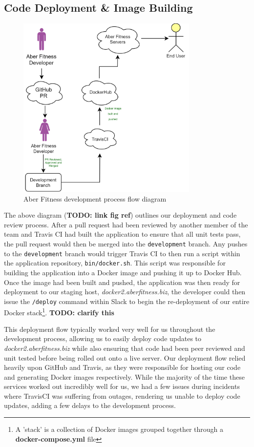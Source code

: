 
\subsection{Code Deployment \& Image Building}
\begin{figure}[H]
    \centering
    \includegraphics[width=0.8\textwidth]{Images/diagram_af.png}
    \caption{Aber Fitness development process flow diagram}
\end{figure}

The above diagram (\textbf{TODO: link fig ref}) outlines our deployment and code review process. After a pull request had been reviewed by another member of the team and Travis CI had built the application to ensure that all unit tests pass, the pull request would then be merged into the \lstinline{development} branch. Any pushes to the \lstinline{development} branch would trigger Travis CI to then run a script within the application repository, \lstinline{bin/docker.sh}. This script was responsible for building the application into a Docker image and pushing it up to Docker Hub. Once the image had been built and pushed, the application was then ready for deployment to our staging host, \textit{docker2.aberfitness.biz}, the developer could then issue the \lstinline{/deploy} command within Slack to begin the re-deployment of our entire Docker stack\footnote{A 'stack' is a collection of Docker images grouped together through a \textbf{docker-compose.yml} file}. \textbf{TODO: clarify this}

This deployment flow typically worked very well for us throughout the development process, allowing us to easily deploy code updates to \textit{docker2.aberfitness.biz} while also ensuring that code had been peer reviewed and unit tested before being rolled out onto a live server. Our deployment flow relied heavily upon GitHub and Travis, as they were responsible for hosting our code and generating Docker images respectively. While the majority of the time these services worked out incredibly well for us, we had a few issues during incidents where TravisCI was suffering from outages, rendering us unable to deploy code updates, adding a few delays to the development process.

